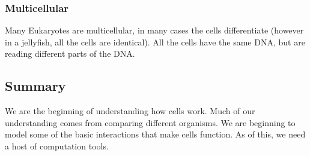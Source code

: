 \subsubsection{Multicellular}
Many Eukaryotes are multicellular, in many cases the cells differentiate (however in a jellyfish, all the cells are identical). All the cells have the same DNA, but are reading different parts of the DNA.

\subsection{Summary}
We are the beginning of understanding how cells work. Much of our understanding comes from comparing different organisms. We are beginning to model some of the basic interactions that make cells function. As of this, we need a host of computation tools.



